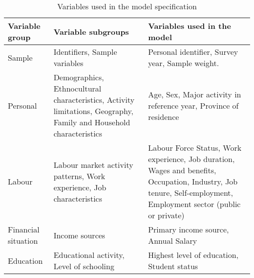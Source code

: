 \renewcommand{\arraystretch}{1.5}
\begin{table}[H]
    \begin{tabular}{p{2.5cm}p{5.5cm}p{7cm}}
        \textbf{Variable group} & \textbf{Variable subgroups} & \textbf{Variables used in the model} \\
        \hline
        \rowcolor{lightgray} Sample & Identifiers, Sample variables & Personal identifier, Survey year, Sample weight. \\

        Personal & Demographics, Ethnocultural characteristics, Activity limitations, Geography, Family and Household characteristics & Age, Sex, Major activity in reference year, Province of residence \\

        \rowcolor{lightgray} Labour & Labour market activity patterns, Work experience, Job characteristics & Labour Force Status, Work experience, Job duration, Wages and benefits, Occupation, Industry, Job tenure, Self-employment, Employment sector (public or private) \\ 

        Financial situation & Income sources & Primary income source, Annual Salary \\

        \rowcolor{lightgray} Education & Educational activity, Level of schooling & Highest level of education, Student status \\

        \hline
    \end{tabular}
    \caption{\label{table:slid_vars} Variables used in the model specification}
\end{table}